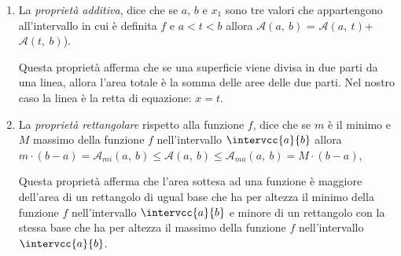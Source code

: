 \begin{enumerate}
 \item
La \emph{proprietà additiva}, dice che se \(a\), \(b\) e \(x_1\) 
sono tre valori che appartengono all'intervallo in cui è definita \(f\) e 
\(a < t < b\)
allora \(\mathcal{A}(a,~b)\) = 
\(\mathcal{A}(a,~t)\)+\(\mathcal{A}(t,~b)\)).

\begin{minipage}{.49\textwidth}
\begin{inaccessibleblock} 
  \areasottesacurva
\end{inaccessibleblock}
\end{minipage}
\hfill
\begin{minipage}{.49\textwidth}
\begin{inaccessibleblock} 
  \propradditiva
\end{inaccessibleblock}
\end{minipage}

Questa proprietà afferma che se una superficie 
viene divisa in due parti da una linea, 
allora l'area totale è la somma delle aree delle due parti.
Nel nostro caso la linea è la retta di equazione: \(x = t\).

 \item 
La \emph{proprietà rettangolare} rispetto alla funzione \(f\), 
dice che se \(m\) è il minimo e \(M\) massimo della funzione \(f\) 
nell'intervallo \(\intervcc{a}{b}\)
allora \\
\(m\cdot(b-a) = \mathcal{A}_{mi}(a,~b) \leq \mathcal{A}(a,~b) \leq
                       \mathcal{A}_{ma}(a,~b) = M\cdot(b-a)\),

\begin{minipage}{.49\textwidth}
\begin{inaccessibleblock} 
  \areaminore
\end{inaccessibleblock}
\end{minipage}
\hfill
\begin{minipage}{.49\textwidth}
\begin{inaccessibleblock} 
  \areamaggiore
\end{inaccessibleblock}
\end{minipage}

Questa proprietà afferma che l'area sottesa ad una funzione è maggiore 
dell'area di un rettangolo di ugual base che ha per altezza il minimo della 
funzione \(f\) nell'intervallo \(\intervcc{a}{b}\) 
e minore di un rettangolo con la stessa base che ha per altezza il massimo 
della funzione \(f\) nell'intervallo \(\intervcc{a}{b}\). 
\end{enumerate}

